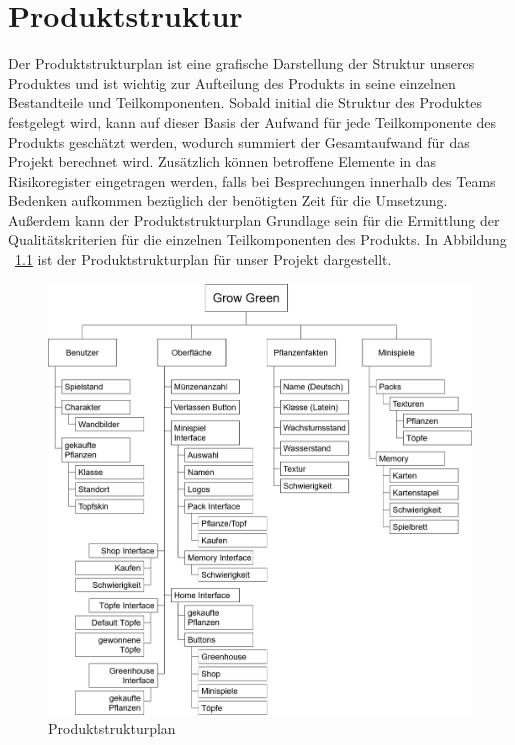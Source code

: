 \chapter{Produktstruktur}\label{ch:produktstruktur}
Der Produktstrukturplan ist eine grafische Darstellung der Struktur unseres Produktes und ist wichtig
zur Aufteilung des Produkts in seine einzelnen Bestandteile und Teilkomponenten.
Sobald initial die Struktur des Produktes festgelegt wird, kann auf dieser Basis der Aufwand für jede Teilkomponente des
Produkts geschätzt werden, wodurch summiert der Gesamtaufwand für das Projekt berechnet wird. 
Zusätzlich können betroffene Elemente in das Risikoregister eingetragen werden, falls bei Besprechungen innerhalb des 
Teams Bedenken aufkommen bezüglich der benötigten Zeit für die Umsetzung.
Außerdem kann der Produktstrukturplan Grundlage sein für die Ermittlung der Qualitätskriterien für die einzelnen 
Teilkomponenten des Produkts. 
In Abbildung ~\ref{fig:produktstrukturplan} ist der Produktstrukturplan für unser Projekt dargestellt.
\vspace{1cm}
\begin{figure}[h]
    \centering
    \includegraphics[width=0.8\linewidth]{../bilder/Produktstrukturplan}
    \vspace{0.5cm}
    \caption{Produktstrukturplan}
    \label{fig:produktstrukturplan}
\end{figure}